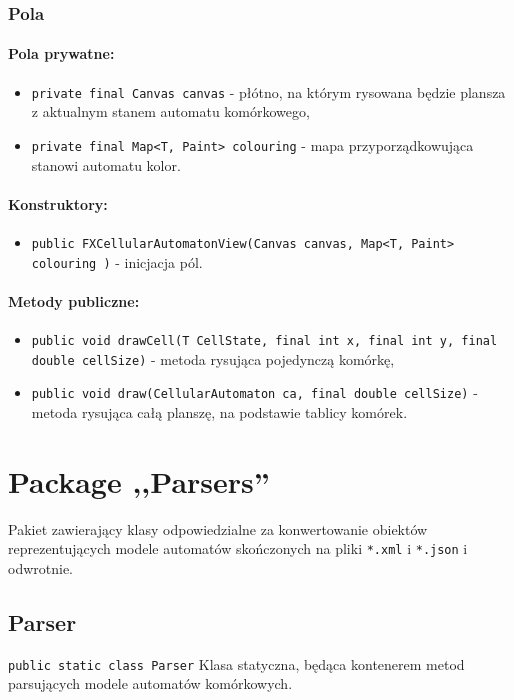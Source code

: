 \documentclass{report}
\begin{document}
\subsubsection{Pola}
\paragraph{Pola prywatne:}
\begin{itemize}
	\item \texttt{private final Canvas canvas} - płótno, na którym rysowana będzie plansza z aktualnym stanem automatu komórkowego,
	\item \texttt{private final Map<T, Paint> colouring} - mapa przyporządkowująca stanowi automatu kolor.
\end{itemize}
\paragraph{Konstruktory:}
\begin{itemize}
	\item \texttt{public FXCellularAutomatonView(Canvas canvas, Map<T, Paint> colouring )} - inicjacja pól.
\end{itemize}
\paragraph{Metody publiczne:}
\begin{itemize}
	\item \texttt{public void drawCell(T CellState, final int x, final int y, final double cellSize)} - metoda rysująca pojedynczą komórkę,
	\item \texttt{public void draw(CellularAutomaton ca, final double cellSize)} - metoda rysująca całą planszę, na podstawie tablicy komórek.
\end{itemize}

\section{Package ,,Parsers''}
Pakiet zawierający klasy odpowiedzialne za konwertowanie obiektów reprezentujących modele automatów skończonych na pliki \texttt{*.xml} i \texttt{*.json} i odwrotnie.

\subsection{Parser}
\texttt{public static class Parser}
Klasa statyczna, będąca kontenerem metod parsujących modele automatów komórkowych.
\end{document}
